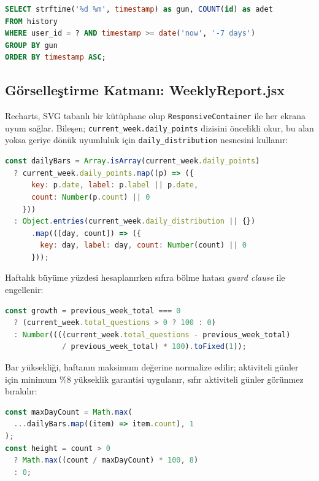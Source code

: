 \documentclass[12pt,a4paper]{article}
\begin{document}
\begin{lstlisting}[language=SQL, caption=Haftalık Veri Çekme Sorgusu]
SELECT strftime('%d %m', timestamp) as gun, COUNT(id) as adet
FROM history
WHERE user_id = ? AND timestamp >= date('now', '-7 days')
GROUP BY gun
ORDER BY timestamp ASC;
\end{lstlisting}

\subsection{Görselleştirme Katmanı: WeeklyReport.jsx}
Recharts, SVG tabanlı bir kütüphane olup \texttt{ResponsiveContainer} ile her ekrana uyum sağlar. Bileşen; \texttt{current\_week.daily\_points} dizisini öncelikli okur, bu alan yoksa geriye dönük uyumluluk için \texttt{daily\_distribution} nesnesini kullanır:

\begin{lstlisting}[language=JavaScript, caption=WeeklyReport.jsx -- Çift Kaynak Veri Normalizasyonu (satır 11--21)]
const dailyBars = Array.isArray(current_week.daily_points)
  ? current_week.daily_points.map((p) => ({
      key: p.date, label: p.label || p.date,
      count: Number(p.count) || 0
    }))
  : Object.entries(current_week.daily_distribution || {})
      .map(([day, count]) => ({
        key: day, label: day, count: Number(count) || 0
      }));
\end{lstlisting}

Haftalık büyüme yüzdesi hesaplanırken sıfıra bölme hatası \textit{guard clause} ile engellenir:

\begin{lstlisting}[language=JavaScript, caption=WeeklyReport.jsx -- Büyüme Hesabı (satır 7--9)]
const growth = previous_week_total === 0
  ? (current_week.total_questions > 0 ? 100 : 0)
  : Number((((current_week.total_questions - previous_week_total)
             / previous_week_total) * 100).toFixed(1));
\end{lstlisting}

Bar yüksekliği, haftanın maksimum değerine normalize edilir; aktiviteli günler için minimum \%8 yükseklik garantisi uygulanır, sıfır aktiviteli günler görünmez bırakılır:

\begin{lstlisting}[language=JavaScript, caption=WeeklyReport.jsx -- Bar Yükseklik Normalizasyonu (satır 91)]
const maxDayCount = Math.max(
  ...dailyBars.map((item) => item.count), 1
);
const height = count > 0
  ? Math.max((count / maxDayCount) * 100, 8)
  : 0;
\end{lstlisting}
\end{document}
